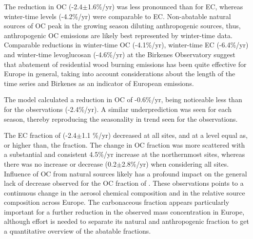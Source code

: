 The reduction in OC (-2.4$\pm$1.6\%/yr) was less pronounced than for EC,
whereas winter-time levels (-4.2\%/yr) were comparable to EC. Non-abatable
natural sources of OC peak in the growing season diluting anthropogenic
sources, thus, anthropogenic OC emissions are likely best represented by
winter-time data. Comparable reductions in winter-time OC (-4.1\%/yr),
winter-time EC (-6.4\%/yr) and winter-time levoglucosan (-4.6\%/yr)
at the Birkenes Observatory suggest that abatement of residential
wood burning emissions has been quite effective for Europe in general,
taking into account considerations about the length of the time series
and Birkenes as an indicator of European emissions.

The model calculated a reduction in OC of -0.6\%/yr, being noticeable
less than for the observations (-2.4\%/yr). A similar underprediction
was seen for each season, thereby reproducing the seasonality in trend
seen for the observations.

The EC fraction of \pmfine (-2.4$\pm$1.1 \%/yr) decreased at all
sites, and at a level equal as, or higher than, the  fraction. The
change in OC fraction was more scattered with a substantial and
consistent 4.5\%/yr increase at the northernmost sites, whereas
there was no increase or decrease (0.2$\pm$2.8\%/yr) when considering
all sites. Influence of OC from natural sources likely has a profound
impact on the general lack of decrease observed for the OC fraction of
\pmfine. These observations points to a continuous change in the aerosol
chemical composition and in the relative source composition across
Europe. The carbonaceous fraction appears particularly important for a
further reduction in the observed \pmfine mass concentration in Europe,
although effort is needed to separate its natural and anthropogenic
fraction to get a quantitative overview of the abatable fractions.


\clearpage
\renewcommand\bibname{References}      %
